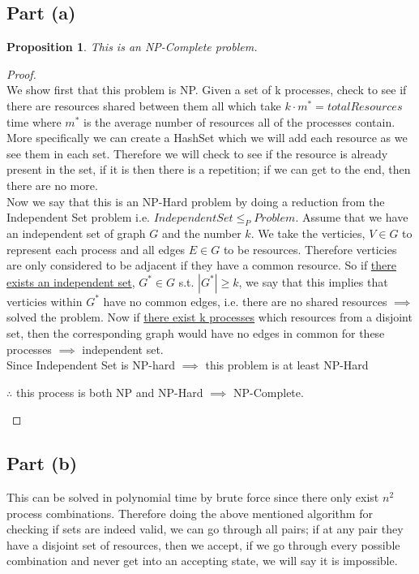 \documentclass[12pt]{article}
\newtheorem{proposition}[theorem]{Proposition}
\begin{document}
\subsection{Part (a)}
\begin{proposition}
This is an NP-Complete problem.
\end{proposition}

\begin{proof}
~ \\ \indent We show first that this problem is NP. Given a set of k processes, check
to see if there are resources shared between them all which take $k\cdot m^{\ast} = totalResources$
time where $m^{\ast}$ is the average number of resources all of the processes contain.
More specifically we can create a HashSet which we will add each resource as we see them
in each set. Therefore we will check to see if the resource is already present in the
set, if it is then there is a repetition; if we can get to the end, then there are no more. \\
\indent Now we say that this is an NP-Hard problem by doing a reduction from the Independent
Set problem i.e. $IndependentSet \leq_P Problem$. Assume that we have an independent set of
graph $G$ and the number $k$. We take the verticies, $V \in G$ to represent each process and
all edges $E \in G$ to be resources. Therefore verticies are only considered to be adjacent if
they have a common resource. So if \underline{there exists an independent set}, $G^{\ast}\in G$
s.t. $|G^{\ast}| \geq k$, we say that this implies that verticies within $G^{\ast}$ have no
common edges, i.e. there are no shared resources $\implies$ solved the problem. Now if
\underline{there exist k processes} which resources from a disjoint set, then the corresponding
graph would have no edges in common for these processes $\implies$ independent set. \\
\indent Since Independent Set is NP-hard $\implies$ this problem is at least NP-Hard
\begin{center}$\therefore$ this process is both NP and NP-Hard $\implies$ NP-Complete.\end{center}
\end{proof}

\subsection{Part (b)}
This can be solved in polynomial time by brute force since there only exist $n^2$ process
combinations. Therefore doing the above mentioned algorithm for checking if sets are indeed
valid, we can go through all pairs; if at any pair they have a disjoint set of resources, then
we accept, if we go through every possible combination and never get into an accepting state,
we will say it is impossible.
\end{document}
